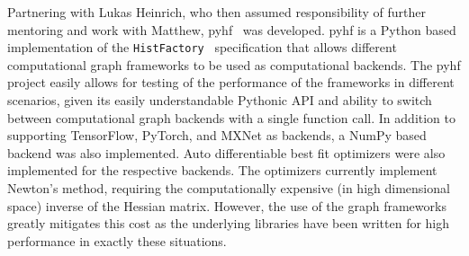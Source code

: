 Partnering with Lukas Heinrich, who then assumed responsibility of further mentoring and work with Matthew, pyhf~\cite{lukas_heinrich_2018_1172961} was developed.
pyhf is a Python based implementation of the \texttt{HistFactory}~\cite{Cranmer:2012sba} specification that allows different computational graph frameworks to be used as computational backends.
The pyhf project easily allows for testing of the performance of the frameworks in different scenarios, given its easily understandable Pythonic API and ability to switch between computational graph backends with a single function call.
In addition to supporting TensorFlow, PyTorch, and MXNet as backends, a NumPy based backend was also implemented.
Auto differentiable best fit optimizers were also implemented for the respective backends.
The optimizers currently implement Newton's method, requiring the computationally expensive (in high dimensional space) inverse of the Hessian matrix.
However, the use of the graph frameworks greatly mitigates this cost as the underlying libraries have been written for high performance in exactly these situations.
